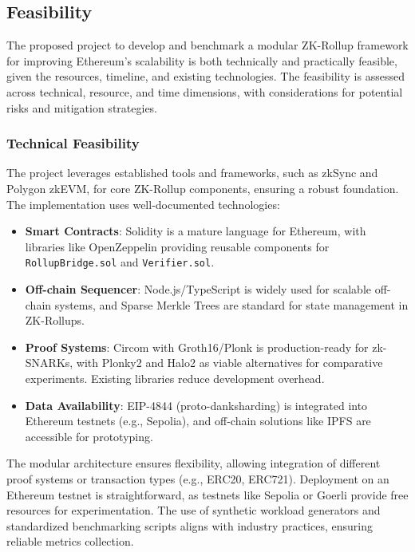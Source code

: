 \subsection{Feasibility}
\vspace{12pt}

The proposed project to develop and benchmark a modular ZK-Rollup framework for improving Ethereum's scalability is both technically and practically feasible, given the resources, timeline, and existing technologies. The feasibility is assessed across technical, resource, and time dimensions, with considerations for potential risks and mitigation strategies.

\subsubsection{Technical Feasibility}
\vspace{12pt}
The project leverages established tools and frameworks, such as zkSync and Polygon zkEVM, for core ZK-Rollup components, ensuring a robust foundation. The implementation uses well-documented technologies:
\vspace{12pt}
\begin{itemize}
    \item \textbf{Smart Contracts}: Solidity is a mature language for Ethereum, with libraries like OpenZeppelin providing reusable components for \texttt{RollupBridge.sol} and \texttt{Verifier.sol}.
    \item \textbf{Off-chain Sequencer}: Node.js/TypeScript is widely used for scalable off-chain systems, and Sparse Merkle Trees are standard for state management in ZK-Rollups.
    \item \textbf{Proof Systems}: Circom with Groth16/Plonk is production-ready for zk-SNARKs, with Plonky2 and Halo2 as viable alternatives for comparative experiments. Existing libraries reduce development overhead.
    \item \textbf{Data Availability}: EIP-4844 (proto-danksharding) is integrated into Ethereum testnets (e.g., Sepolia), and off-chain solutions like IPFS are accessible for prototyping.
\end{itemize}
\vspace{12pt}
The modular architecture ensures flexibility, allowing integration of different proof systems or transaction types (e.g., ERC20, ERC721). Deployment on an Ethereum testnet is straightforward, as testnets like Sepolia or Goerli provide free resources for experimentation. The use of synthetic workload generators and standardized benchmarking scripts aligns with industry practices, ensuring reliable metrics collection.
\vspace{12pt}

